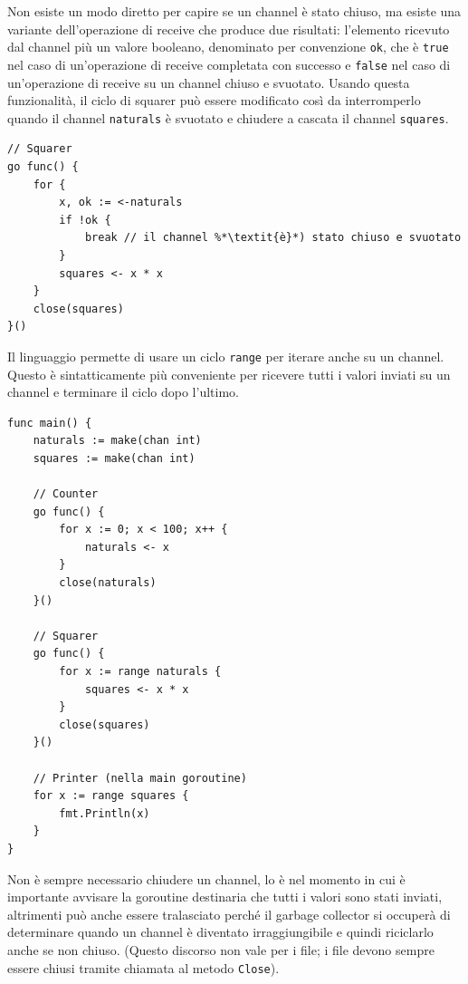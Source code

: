 \documentclass[../../../thesis.tex]{subfiles}
\begin{document}
    Non esiste un modo diretto per capire se un channel è stato chiuso, ma esiste una variante dell'operazione di receive che produce due risultati: l'elemento ricevuto dal channel più un valore booleano, denominato per convenzione \verb"ok", che è \verb"true" nel caso di un'operazione di receive completata con successo e \verb"false" nel caso di un'operazione di receive su un channel chiuso e svuotato.
    Usando questa funzionalità, il ciclo di squarer può essere modificato così da interromperlo quando il channel \verb"naturals" è svuotato e chiudere a cascata il channel \verb"squares".
    \begin{lstlisting}[frame = single,label={lst:lstlisting7-4-2.3}]
// Squarer
go func() {
    for {
        x, ok := <-naturals
        if !ok {
            break // il channel %*\textit{è}*) stato chiuso e svuotato
        }
        squares <- x * x
    }
    close(squares)
}()
    \end{lstlisting}
    Il linguaggio permette di usare un ciclo \verb"range" per iterare anche su un channel.
    Questo è sintatticamente più conveniente per ricevere tutti i valori inviati su un channel e terminare il ciclo dopo l'ultimo.
    \begin{lstlisting}[frame = single,label={lst:lstlisting7-4-2.4}]
func main() {
    naturals := make(chan int)
    squares := make(chan int)

    // Counter
    go func() {
        for x := 0; x < 100; x++ {
            naturals <- x
        }
        close(naturals)
    }()

    // Squarer
    go func() {
        for x := range naturals {
            squares <- x * x
        }
        close(squares)
    }()

    // Printer (nella main goroutine)
    for x := range squares {
        fmt.Println(x)
    }
}
    \end{lstlisting}
    Non è sempre necessario chiudere un channel, lo è nel momento in cui è importante avvisare la goroutine destinaria che tutti i valori sono stati inviati, altrimenti può anche essere tralasciato perché il garbage collector si occuperà di determinare quando un channel è diventato irraggiungibile e quindi riciclarlo anche se non chiuso. (Questo discorso non vale per i file;
    i file devono sempre essere chiusi tramite chiamata al metodo \verb"Close").
\end{document}
